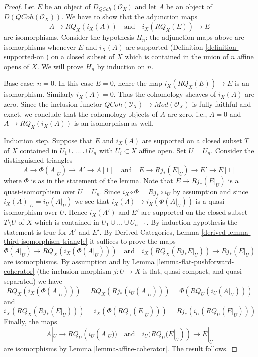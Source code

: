 \documentclass{stacks-project}
\theoremstyle{plain}
\theoremstyle{definition}
\theoremstyle{remark}
\numberwithin{equation}{subsection}
\def\QCoh{\mathit{QCoh}}
\begin{document}
\begin{proof}
Let $E$ be an object of $D_\QCoh(\mathcal{O}_X)$ and
let $A$ be an object of $D(\QCoh(\mathcal{O}_X))$.
We have to show that the adjunction maps
$$
A \to RQ_X(i_X(A))
\quad\text{and}\quad
i_X(RQ_X(E)) \to E
$$
are isomorphisms. Consider the hypothesis
$H_n$: the adjunction maps above are isomorphisms
whenever $E$ and $i_X(A)$ are supported
(Definition \ref{definition-supported-on})
on a closed subset of $X$ which
is contained in the union of $n$ affine opens of $X$.
We will prove $H_n$ by induction on $n$.

\medskip\noindent
Base case: $n = 0$. In this case $E = 0$, hence the map
$i_X(RQ_X(E)) \to E$ is an isomorphism. Similarly $i_X(A) = 0$.
Thus the cohomology sheaves of $i_X(A)$ are zero. Since the inclusion
functor $\QCoh(\mathcal{O}_X) \to \textit{Mod}(\mathcal{O}_X)$
is fully faithful and exact, we conclude that the cohomology
objects of $A$ are zero, i.e., $A = 0$ and
$A \to RQ_X(i_X(A))$ is an isomorphism as well.

\medskip\noindent
Induction step. Suppose that $E$ and $i_X(A)$ are supported on a
closed subset $T$ of $X$ contained in $U_1 \cup \ldots \cup U_n$
with $U_i \subset X$ affine open. Set $U = U_n$.
Consider the distinguished triangles
$$
A \to \Phi(A|_U) \to A' \to A[1]
\quad\text{and}\quad
E \to Rj_*(E|_U) \to E' \to E[1]
$$
where $\Phi$ is as in the statement of the lemma.
Note that $E \to Rj_*(E|_U)$ is a quasi-isomorphism over $U = U_n$.
Since $i_X \circ \Phi = Rj_* \circ i_U$ by assumption
and since $i_X(A)|_U = i_U(A|_U)$
we see that $i_X(A) \to i_X(\Phi(A|_U))$ is a quasi-isomorphism over $U$.
Hence $i_X(A')$ and $E'$ are supported on the closed
subset $T \setminus U$ of $X$ which is contained in
$U_1 \cup \ldots \cup U_{n - 1}$.
By induction hypothesis the statement is true for $A'$ and $E'$. By
Derived Categories, Lemma \ref{derived-lemma-third-isomorphism-triangle}
it suffices to prove the maps
$$
\Phi(A|_U) \to RQ_X(i_X(\Phi(A|_U)))
\quad\text{and}\quad
i_X(RQ_X(Rj_*E|_U)) \to Rj_*(E|_U)
$$
are isomorphisms. By assumption and by
Lemma \ref{lemma-flat-pushforward-coherator}
(the inclusion morphism $j : U \to X$ is flat, quasi-compact, and
quasi-separated) we have
$$
RQ_X(i_X(\Phi(A|_U))) = RQ_X(Rj_*(i_U(A|_U))) = \Phi(RQ_U(i_U(A|_U)))
$$
and
$$
i_X(RQ_X(Rj_*(E|_U))) = i_X(\Phi(RQ_U(E|_U))) = Rj_*(i_U(RQ_U(E|_U)))
$$
Finally, the maps
$$
A|_U \to RQ_U(i_U(A|_U))
\quad\text{and}\quad
i_U(RQ_U(E|_U)) \to E|_U
$$
are isomorphisms by Lemma \ref{lemma-affine-coherator}. The result follows.
\end{proof}
\end{document}
